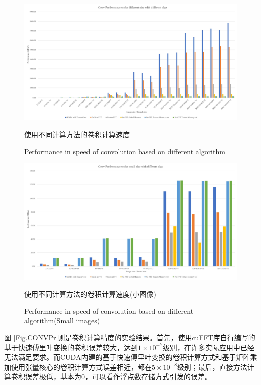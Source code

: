 \begin{figure}
	\centering
	\includegraphics[width=15cm]{figures/CONVPerf.jpg}
	\renewcommand{\thefigure}{\arabic{section}-\arabic{figure} }
	\renewcommand{\figurename}{图}
	\caption{使用不同计算方法的卷积计算速度}
	\addtocounter{figure}{-1}
	\renewcommand{\thefigure}{\arabic{section}-\arabic{figure} }
	\renewcommand{\figurename}{Figure}
	\caption{Performance in speed of convolution based on different algorithm}
	\label{Fig.CONVPerf}
\end{figure}
\begin{figure}
	\centering
	\includegraphics[width=15cm]{figures/CONVSubPerf.jpg}
	\renewcommand{\thefigure}{\arabic{section}-\arabic{figure} }
	\renewcommand{\figurename}{图}
	\caption{使用不同计算方法的卷积计算速度(小图像)}
	\addtocounter{figure}{-1}
	\renewcommand{\thefigure}{\arabic{section}-\arabic{figure} }
	\renewcommand{\figurename}{Figure}
	\caption{Performance in speed of convolution based on different algorithm(Small images)}
	\label{Fig.CONVSubPerf}
\end{figure}
\par 图 \ref{Fig.CONVPr}则是卷积计算精度的实验结果。首先，使用cuFFT库自行编写的基于快速傅里叶变换的卷积误差较大，达到$ 1\times 10^{-7} $级别，在许多实际应用中已经无法满足要求。而CUDA内建的基于快速傅里叶变换的卷积计算方式和基于矩阵乘加使用张量核心的卷积计算方式误差相近，都在$ 5\times 10^{-8} $级别；最后，直接方法计算卷积误差极低，基本为0，可以看作浮点数存储方式引发的误差。
